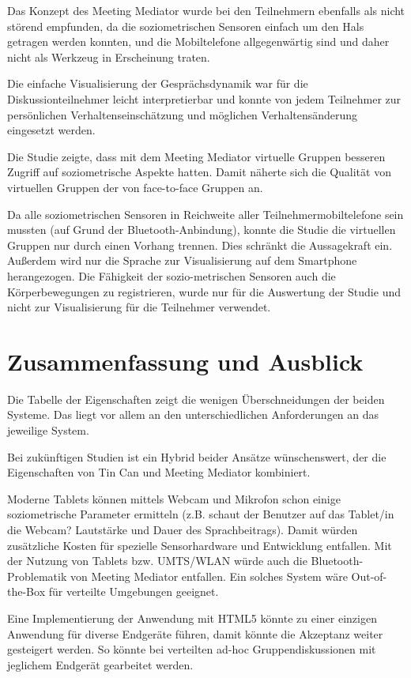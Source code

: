 \documentclass{seminarvorlage}
\begin{document}
Das Konzept des Meeting Mediator wurde bei den Teilnehmern ebenfalls als nicht
störend empfunden, da die soziometrischen Sensoren einfach um den Hals getragen
werden konnten, und die Mobiltelefone allgegenwärtig sind und daher nicht als
Werkzeug in Erscheinung traten.

Die einfache Visualisierung der Gesprächsdynamik war für die
Diskussionteilnehmer leicht interpretierbar und konnte von jedem Teilnehmer zur
per\-sön\-lich\-en Ver\-haltens\-ein\-schätz\-ung und möglichen
Verhaltensänderung eingesetzt werden.

Die Studie \cite{KimChaHolPent2008} zeigte, dass mit dem Meeting Mediator
virtuelle Gruppen besseren Zugriff auf soziometrische Aspekte hatten. Damit
näherte sich die Qualität von virtuellen Gruppen der von face-to-face Gruppen
an.

Da alle soziometrischen Sensoren in Reichweite aller Teilnehmermobiltelefone
sein mussten (auf Grund der Bluetooth-Anbindung), konnte die Studie
\cite{KimChaHolPent2008} die virtuellen Gruppen nur durch einen Vorhang trennen.
Dies schränkt die Aussagekraft ein.
Außerdem wird nur die Sprache zur Visualisierung auf dem Smartphone
herangezogen. Die Fähigkeit der sozio-metrischen Sensoren auch die
Körperbewegungen zu registrieren, wurde nur für die Auswertung der Studie
\cite{KimChaHolPent2008} und nicht zur Visualisierung für die Teilnehmer
verwendet.


\section{Zusammenfassung und Ausblick}
Die Tabelle der Eigenschaften zeigt die wenigen Über\-schneid\-ung\-en
der beiden Systeme. Das liegt vor allem an den unterschiedlichen Anforderungen
an das jeweilige System.

Bei zukünftigen Studien ist ein Hybrid beider Ansätze
wün\-schens\-wert, der die Eigenschaften von Tin Can und Meeting
Mediator kombiniert.

Moderne Tablets können mittels Webcam und Mikrofon schon einige soziometrische
Parameter ermitteln (z.B. schaut der Benutzer auf das Tablet/in die Webcam?
Lautstärke und Dauer des Sprachbeitrags). Damit würden zusätzliche Kosten für
spezielle Sensorhardware und Entwicklung entfallen. Mit der Nutzung von Tablets
bzw.
UMTS/WLAN würde auch die Bluetooth-Problematik von Meeting Mediator entfallen.
Ein solches System wäre Out-of-the-Box für verteilte Umgebungen geeignet.

Eine Implementierung der Anwendung mit HTML5 könnte zu einer einzigen Anwendung
für diverse Endgeräte führen, damit könn\-te die Akzeptanz weiter gesteigert werden. So
könn\-te bei verteilten ad-hoc Gruppendiskussionen mit jeglichem Endgerät
gearbeitet werden.
\end{document}
